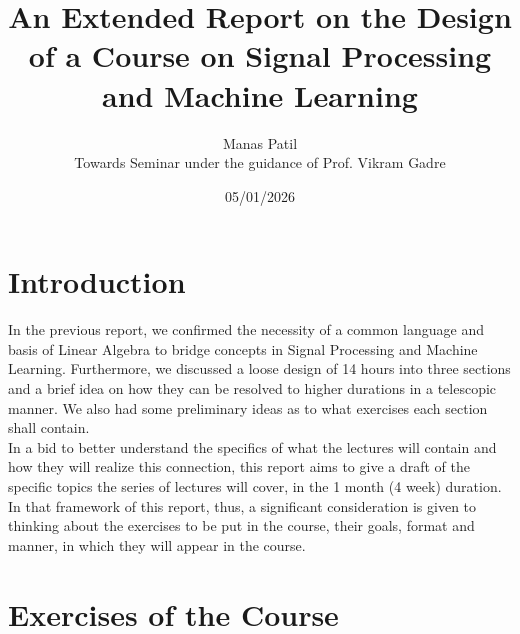 \documentclass[12pt]{article}
\title{An Extended Report on the Design of a Course on Signal Processing and Machine Learning}
\author{Manas Patil \\Towards Seminar under the guidance of Prof. Vikram Gadre}
\date{05/01/2026}
\begin{document}
\maketitle

\section{Introduction}
In the previous report, we confirmed the necessity of a common language and basis of Linear Algebra to bridge concepts in Signal Processing and Machine Learning. Furthermore, we discussed a loose design of 14 hours into three sections and a brief idea on how they can be resolved to higher durations in a telescopic manner. We also had some preliminary ideas as to what exercises each section shall contain. \\
In a bid to better understand the specifics of what the lectures will contain and how they will realize this connection, this report aims to give a draft of the specific topics the series of lectures will cover, in the 1 month (4 week) duration. In that framework of this report, thus, a significant consideration is given to thinking about the exercises to be put in the course, their goals, format and manner, in which they will appear in the course. 

\section{Exercises of the Course}
\end{document}
